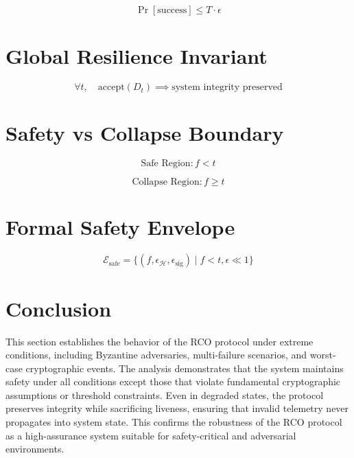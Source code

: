 \begin{equation}
\Pr[\text{success}] \leq T \cdot \epsilon
\end{equation}

\section{Global Resilience Invariant}

\begin{equation}
\forall t, \quad \text{accept}(D_t) \implies \text{system integrity preserved}
\end{equation}

\section{Safety vs Collapse Boundary}

\begin{equation}
\text{Safe Region}: f < t
\end{equation}

\begin{equation}
\text{Collapse Region}: f \geq t
\end{equation}

\section{Formal Safety Envelope}

\begin{equation}
\mathcal{E}_{\text{safe}} = \{(f, \epsilon_{\mathcal{H}}, \epsilon_{\text{sig}}) \mid f < t, \epsilon \ll 1\}
\end{equation}

\section{Conclusion}

This section establishes the behavior of the RCO protocol under extreme conditions, including Byzantine adversaries, multi-failure scenarios, and worst-case cryptographic events. The analysis demonstrates that the system maintains safety under all conditions except those that violate fundamental cryptographic assumptions or threshold constraints. Even in degraded states, the protocol preserves integrity while sacrificing liveness, ensuring that invalid telemetry never propagates into system state. This confirms the robustness of the RCO protocol as a high-assurance system suitable for safety-critical and adversarial environments.